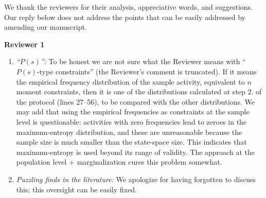 \documentclass{article}
\begin{document}
We thank the reviewers for their analysis, appreciative words, and
suggestions. Our reply below does not address the points that can be easily
addressed by amending our manuscript.

\bigskip

\textbf{Reviewer 1}
\begin{enumerate}[wide]
\item \emph{\enquote{$P(s)$}:} To be honest we are not sure what the
  Reviewer means with \enquote{$P(s)$-type constraints} (the Reviewer's
  comment is truncated). If it means the empirical frequency distribution
  of the sample activity, equivalent to $n$ moment constraints, then it is
  one of the distributions calculated at step 2. of the protocol (lines
  27--56), to be compared with the other distributions. We may add that
  using the empirical frequencies as constraints at the sample level
  is questionable: activities with zero frequencies lead to zeroes in the
  maximum-entropy distribution, and these are unreasonable because the
  sample size is much smaller than the state-space size. This indicates
  that maximum-entropy is used beyond its range of validity. The approach
  at the population level + marginalization cures this problem somewhat.
\item \emph{Puzzling finds in the literature:} We apologize for having
  forgotten to discuss this; this oversight can be easily fixed.
\end{enumerate}

\bigskip
\end{document}
